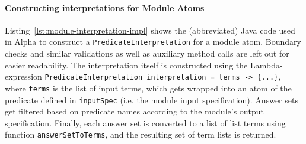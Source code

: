 \paragraph{Constructing interpretations for Module Atoms}
Listing~\ref{lst:module-interpretation-impl} shows the (abbreviated) Java code used in Alpha to construct a \texttt{PredicateInterpretation} for a module atom. Boundary checks and similar validations as well as auxiliary method calls are left out for easier readability. The interpretation itself is constructed using the Lambda-expression \texttt{PredicateInterpretation interpretation = terms -> \{...\}}, where \texttt{terms} is the list of input terms, which gets wrapped into an atom of the predicate defined in \texttt{inputSpec} (i.e. the module input specification). Answer sets get filtered based on predicate names according to the module's output specification. Finally, each answer set is converted to a list of list terms using function \texttt{answerSetToTerms}, and the resulting set of term lists is returned.

